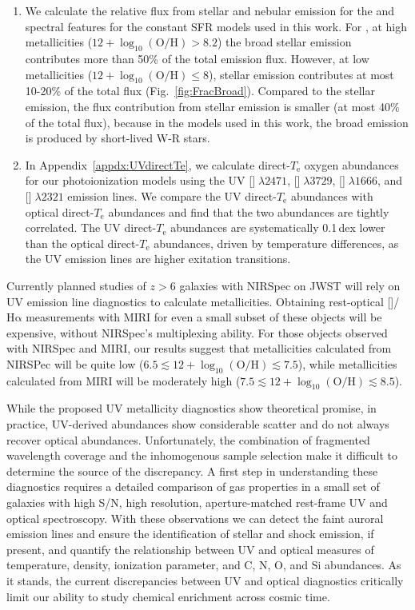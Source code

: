 \documentclass[preprint2]{aastex62}
\newcommand{\nii}{[\ion{N}{2}]}
\newcommand{\oiii}{[\ion{O}{3}]}
\newcommand{\oii}{[\ion{O}{2}]}
\newcommand{\heii}{\ion{He}{2}}
\newcommand{\civ}{\ion{C}{4}}
\newcommand{\ha}{\ensuremath{\mathrm{H\alpha}}\xspace}
\newcommand{\logten}{\ensuremath{\log_{10}}}
\newcommand{\logOH}{\ensuremath{\logten (\mathrm{O}/\mathrm{H})}\xspace}
\newcommand{\Te}{\ensuremath{T_{\mathrm{e}}}\xspace}
\begin{document}
\begin{enumerate}
    \item We calculate the relative flux from stellar and nebular emission for the \heii{} and \civ{} spectral features for the constant SFR models used in this work. For \civ{}, at high metallicities ($12+\logOH>8.2$) the broad stellar emission contributes more than 50\% of the total emission flux. However, at low metallicities ($12+\logOH\leq8$), stellar emission contributes at most 10-20\% of the total \civ{} flux (Fig.~\ref{fig:FracBroad}). Compared to the stellar \civ{} emission, the flux contribution from stellar \heii{} emission is smaller (at most 40\% of the total flux), because in the models used in this work, the broad \heii{} emission is produced by short-lived W-R stars.
    \item In Appendix~\ref{appdx:UVdirectTe}, we calculate direct-\Te{} oxygen abundances for our photoionization models using the UV \oii{}$\;\lambda2471$, \oii{}$\;\lambda3729$, \oiii{}$\;\lambda1666$, and \oiii{}$\;\lambda2321$ emission lines. We compare the UV direct-\Te{} abundances with optical direct-\Te abundances and find that the two abundances are tightly correlated. The UV direct-\Te abundances are systematically 0.1\,dex lower than the optical direct-\Te abundances, driven by temperature differences, as the UV emission lines are higher exitation transitions. 
\end{enumerate}

Currently planned studies of $z>6$ galaxies with NIRSpec on JWST will rely on UV emission line diagnostics to calculate metallicities. Obtaining rest-optical \nii{}/\ha{} measurements with MIRI for even a small subset of these objects will be expensive, without NIRSpec's multiplexing ability. For those objects observed with NIRSpec and MIRI, our results suggest that metallicities calculated from NIRSPec will be quite low ($6.5\lesssim 12+\logOH \lesssim 7.5$), while metallicities calculated from MIRI will be moderately high ($7.5\lesssim 12+\logOH \lesssim 8.5$).

While the proposed UV metallicity diagnostics show theoretical promise, in practice, UV-derived abundances show considerable scatter and do not always recover optical abundances. Unfortunately, the combination of fragmented wavelength coverage and the inhomogenous sample selection make it difficult to determine the source of the discrepancy. A first step in understanding these diagnostics requires a detailed comparison of gas properties in a small set of galaxies with high S/N, high resolution, aperture-matched rest-frame UV and optical spectroscopy. With these observations we can detect the faint auroral emission lines and ensure the identification of stellar and shock emission, if present, and quantify the relationship between UV and optical measures of temperature, density, ionization parameter, and C, N, O, and Si abundances. As it stands, the current discrepancies between UV and optical diagnostics critically limit our ability to study chemical enrichment across cosmic time.
\end{document}
